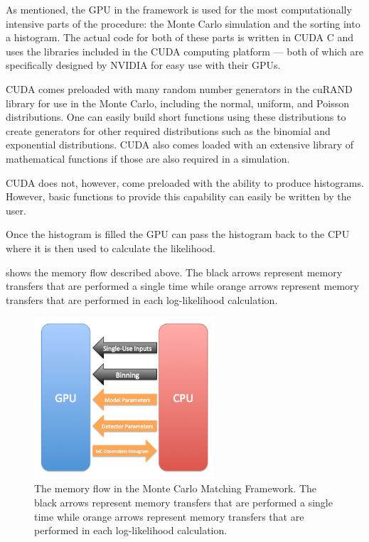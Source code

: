 As mentioned, the GPU in the framework is used for the most computationally intensive parts of the procedure: the Monte Carlo simulation and the sorting into a histogram.  The actual code for both of these parts is written in CUDA C and uses the libraries included in the CUDA computing platform --- both of which are specifically designed by NVIDIA for easy use with their GPUs.

CUDA comes preloaded with many random number generators in the cuRAND library for use in the Monte Carlo, including the normal, uniform, and Poisson distributions.  One can easily build short functions using these distributions to create generators for other required distributions such as the binomial and exponential distributions.  CUDA also comes loaded with an extensive library of mathematical functions if those are also required in a simulation.  

CUDA does not, however, come preloaded with the ability to produce histograms.  However, basic functions to provide this capability can easily be written by the user.  

Once the histogram is filled the GPU can pass the histogram back to the CPU where it is then used to calculate the likelihood.

 shows the memory flow described above.  The black arrows represent memory transfers that are performed a single time while orange arrows represent memory transfers that are performed in each log-likelihood calculation.  


\begin{figure}[t]
        \centering
	\includegraphics[width=0.6\textwidth]{gpu_usage}
	\caption{The memory flow in the Monte Carlo Matching Framework.  The black arrows represent memory transfers that are performed a single time while orange arrows represent memory transfers that are performed in each log-likelihood calculation.}
	\label{fig:gpu_usage}
\end{figure}




